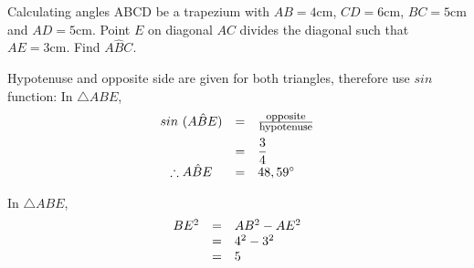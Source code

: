 \begin{wex}
{Calculating angles}
{
ABCD be a trapezium with $AB=4\mbox{cm}$, $CD=6\mbox{cm}$, $BC=5\mbox{cm}$ and $AD=5\mbox{cm}$. Point $E$ on diagonal $AC$ divides the diagonal such that $AE=3\mbox{cm}$. Find $A\hat{B}C$.
}
{



Hypotenuse and opposite side are given for both triangles, therefore use $sin$ function:
In $\triangle ABE$, \\

\begin{equation*}
\begin{array}{ccl}\hfill sin~(A\hat{B}E)& =& \frac{\mbox{\footnotesize opposite}}{\mbox{\footnotesize hypotenuse}}\hfill \vspace{5pt}\\
 \hfill & =& \dfrac{3}{4}\hfill \\
 \therefore A\hat{B}E& =& {48,59}^{\circ }\hfill 
\end{array}
\end{equation*}

In $\triangle ABE$, \\
\begin{equation*}
\begin{array}{ccl}
 \hfill BE^{2} &=& AB^{2} - AE^{2} \hfill \\
\hfill &=& 4^{2} - 3^{2} \hfill \\
\hfill &=& 5 \hfill \\
\end{array}
\end{equation*}

}
\end{wex}
